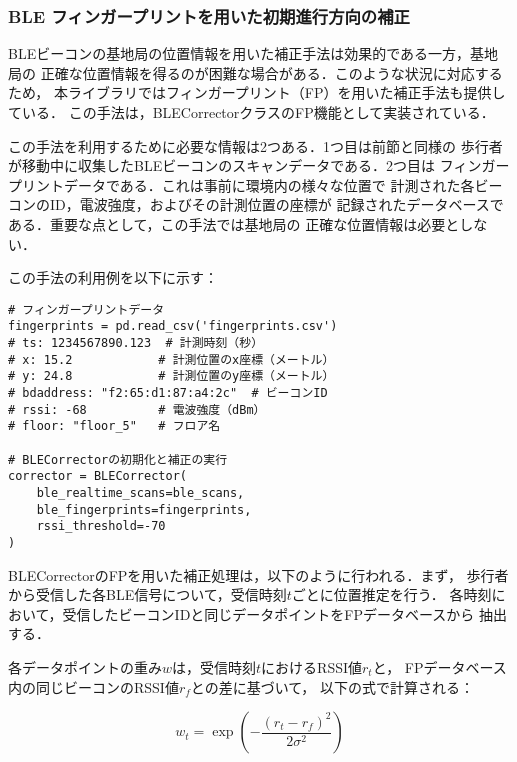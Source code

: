 
\subsubsection{BLE フィンガープリントを用いた初期進行方向の補正}

BLEビーコンの基地局の位置情報を用いた補正手法は効果的である一方，基地局の
正確な位置情報を得るのが困難な場合がある．このような状況に対応するため，
本ライブラリではフィンガープリント（FP）を用いた補正手法も提供している．
この手法は，BLECorrectorクラスのFP機能として実装されている．

この手法を利用するために必要な情報は2つある．1つ目は前節と同様の
歩行者が移動中に収集したBLEビーコンのスキャンデータである．2つ目は
フィンガープリントデータである．これは事前に環境内の様々な位置で
計測された各ビーコンのID，電波強度，およびその計測位置の座標が
記録されたデータベースである．重要な点として，この手法では基地局の
正確な位置情報は必要としない．

この手法の利用例を以下に示す：


\begin{lstlisting}[caption={BLECorrector},label=lst:rotate-trajectory-using-ble-fingerprint,float=ht]
# フィンガープリントデータ
fingerprints = pd.read_csv('fingerprints.csv')
# ts: 1234567890.123  # 計測時刻（秒）
# x: 15.2            # 計測位置のx座標（メートル）
# y: 24.8            # 計測位置のy座標（メートル）
# bdaddress: "f2:65:d1:87:a4:2c"  # ビーコンID
# rssi: -68          # 電波強度（dBm）
# floor: "floor_5"   # フロア名

# BLECorrectorの初期化と補正の実行
corrector = BLECorrector(
    ble_realtime_scans=ble_scans,
    ble_fingerprints=fingerprints,
    rssi_threshold=-70
)
\end{lstlisting}


BLECorrectorのFPを用いた補正処理は，以下のように行われる．まず，
歩行者から受信した各BLE信号について，受信時刻$t$ごとに位置推定を行う．
各時刻において，受信したビーコンIDと同じデータポイントをFPデータベースから
抽出する．

各データポイントの重み$w$は，受信時刻$t$におけるRSSI値$r_t$と，
FPデータベース内の同じビーコンのRSSI値$r_f$との差に基づいて，
以下の式で計算される：

\begin{equation}
w_t = \exp\left(-\frac{(r_t - r_f)^2}{2\sigma^2}\right)
\end{equation}


